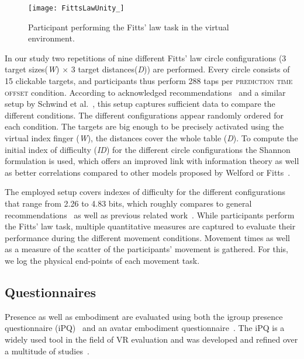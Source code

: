 \documentclass[sigconf]{acmart}
\begin{document}
\begin{figure}[H]
  \centering
  \texttt{[image: FittsLawUnity\_]}
  \caption{Participant performing the Fitts' law task in the virtual environment.}
  \label{fig:FittsLawUnity_}
\end{figure}

In our study two repetitions of nine different Fitts' law circle configurations (3 target sizes(\textit{W}) $\times$ 3 target distances(\textit{D})) are performed.
 Every circle consists of 15 clickable targets, and participants thus perform 288 taps per \textsc{prediction time offset} condition.
 According to acknowledged recommendations~\cite{A2004} and a similar setup by Schwind et al.~\cite{Schwind2019}, this setup captures sufficient data to compare the different conditions. 
The different configurations appear randomly ordered for each condition. 
The targets are big enough to be precisely activated using the virtual index finger (\textit{W}), the distances cover the whole table (\textit{D}). 
To compute the initial index of difficulty (\textit{ID}) for the different circle configurations the Shannon formulation is used, which offers an improved link with information theory as well as better correlations compared to other models proposed by Welford or Fitts~\cite{Mackenzie1989, 10.5555/143848}.

The employed setup covers indexes of difficulty for the different configurations that range from 2.26 to 4.83 bits, which roughly compares to general recommendations~\cite{A2004} as well as previous related work~\cite{Schwind2019}. 
While participants perform the Fitts' law task, multiple quantitative measures are captured to evaluate their performance during the different movement conditions. Movement times as well as a measure of the scatter of the participants' movement is gathered. For this, we log the physical end-points of each movement task.\\

\subsection{Questionnaires}\label{sec:Questionnaires}

Presence as well as embodiment are evaluated using both the igroup presence questionnaire (iPQ)~\cite{Schubert1999} and an avatar embodiment questionnaire~\cite{Gonzalez-Franco2018}. The iPQ is a widely used tool in the field of VR evaluation and was developed and refined over a multitude of studies~\cite{Regenbrecht2002, Schubert2001, Schubert2002}.
\end{document}
